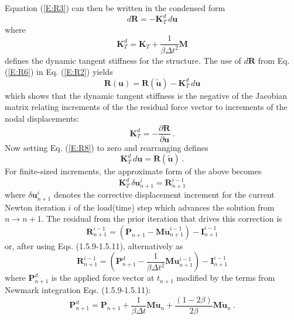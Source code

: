 \documentclass[11pt]{report}
\numberwithin{equation}{section}
\newcommand{\nid}{\noindent}
\begin{document}
Equation (\ref{E:R3}) can then be written in the condensed form
%
\begin{equation}\label{E:R6}
d\bm{R} = - \mathbf{K}_T^d \,d \bm{u}
\end{equation}
%
\noindent where 
\begin{equation}\label{E:R7}
\mathbf{K}_T^d  =\mathbf{K}_T + \frac{1}{\beta \Delta t^2} \mathbf{M} 
\end{equation}
%
defines the dynamic tangent stiffness for the structure. The use of $d\bm{R}$
from Eq. (\ref{E:R6}) in Eq. (\ref{E:R2}) yields
%
\begin{equation}\label{E:R8}
\bm{R} (\bm{u}) = \bm{R}(\tilde{\bm{u}}) - \mathbf{K}_T^d\, d\bm{u} 
\end{equation}
%
\noindent which shows that the dynamic tangent stiffness is the negative of the 
Jacobian matrix relating increments of the the residual force vector to increments of
the nodal displacements:
%
\begin{equation}\label{E:R9}
\mathbf{K}_T^d = -  \frac{\partial \bm{R}}{\partial \bm{u}} \ .
\end{equation}
%
\noindent Now setting Eq. (\ref{E:R8}) to zero and rearranging defines
%
\begin{equation}\label{E:R10}
\mathbf{K}_T^d  \,d\bm{u}= \bm{R}(\tilde{\bm{u}}) \ .
\end{equation}
%
For finite-sized increments, the approximate form of the above becomes
%
\begin{equation}\label{E:R11}
\mathbf{K}_T^d \, \delta\bm{u}_{n+1}^i= \bm{R}_{n+1}^{i-1}
\end{equation}
%
\nid where $\delta \bm{u}_{n+1}^i$ denotes the corrective displacement increment 
for the current Newton iteration $i$ of the load(time) step which 
advances the solution from $n\rightarrow n+1$.
The residual from the prior iteration that drives this correction is 
%
\begin{equation}\label{E:R12}
 \bm{R}_{n+1}^{i-1} =\left ( \bm{P}_{n+1}  - 
 \mathbf{M} \ddot {\bm{u}}_{n+1}^{i-1}\right )- \bm{I}_{n+1}^{i-1}
\end{equation}
%
or, after using Eqs. (1.5.9-1.5.11), alternatively as
%
\begin{equation}\label{E:R13}
 \bm{R}_{n+1}^{i-1} = \left ( \bm{P}_{n+1}^d  - \frac{1}{\beta \Delta t^2} 
 \mathbf{M} {\bm{u}}_{n+1}^{i-1}\right ) - \bm{I}_{n+1}^{i-1}
\end{equation}
%
\nid where $\bm{P}_{n+1}^d$ is the applied force vector at $t_{n+1}$ modified by the
terms from Newmark integration Eqs. (1.5.9-1.5.11):
%
\begin{equation}\label{E:R14}
 \bm{P}_{n+1}^d = \bm{P}_{n+1} + \frac{1}{\beta \Delta t} 
 \mathbf{M} {\dot{\bm{u}}}_n + \frac{\left ( 1 - 2 \beta \right)}{2 \beta}  \mathbf{M} {\ddot{\bm{u}}_n} \ .
\end{equation}
%
\end{document}
